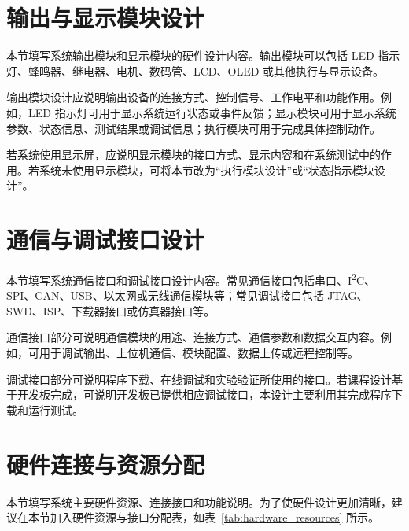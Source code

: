 \section{输出与显示模块设计}

本节填写系统输出模块和显示模块的硬件设计内容。输出模块可以包括 LED 指示灯、蜂鸣器、继电器、电机、数码管、LCD、OLED 或其他执行与显示设备。

输出模块设计应说明输出设备的连接方式、控制信号、工作电平和功能作用。例如，LED 指示灯可用于显示系统运行状态或事件反馈；显示模块可用于显示系统参数、状态信息、测试结果或调试信息；执行模块可用于完成具体控制动作。

若系统使用显示屏，应说明显示模块的接口方式、显示内容和在系统测试中的作用。若系统未使用显示模块，可将本节改为“执行模块设计”或“状态指示模块设计”。

\section{通信与调试接口设计}

本节填写系统通信接口和调试接口设计内容。常见通信接口包括串口、I\textsuperscript{2}C、SPI、CAN、USB、以太网或无线通信模块等；常见调试接口包括 JTAG、SWD、ISP、下载器接口或仿真器接口等。

通信接口部分可说明通信模块的用途、连接方式、通信参数和数据交互内容。例如，可用于调试输出、上位机通信、模块配置、数据上传或远程控制等。

调试接口部分可说明程序下载、在线调试和实验验证所使用的接口。若课程设计基于开发板完成，可说明开发板已提供相应调试接口，本设计主要利用其完成程序下载和运行测试。

\section{硬件连接与资源分配}

本节填写系统主要硬件资源、连接接口和功能说明。为了使硬件设计更加清晰，建议在本节加入硬件资源与接口分配表，如表~\ref{tab:hardware_resources} 所示。

